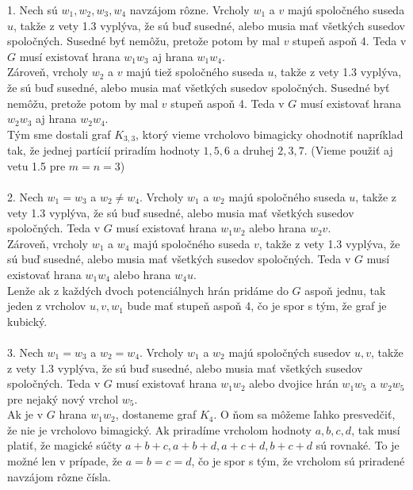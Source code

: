 \documentclass[12pt]{article}
\begin{document}
1. Nech sú $w_1, w_2, w_3, w_4$ navzájom rôzne. Vrcholy $w_1$ a $v$ majú spoločného suseda $u$, takže z vety 1.3 vyplýva, že sú buď susedné, alebo musia mať všetkých susedov spoločných. Susedné byť nemôžu, pretože potom by mal $v$ stupeň aspoň 4. Teda v $G$ musí existovať hrana $w_1 w_3$ aj hrana $w_1 w_4$. \\

Zároveň, vrcholy $w_2$ a $v$ majú tiež spoločného suseda $u$, takže z vety 1.3 vyplýva, že sú buď susedné, alebo musia mať všetkých susedov spoločných. Susedné byť nemôžu, pretože potom by mal $v$ stupeň aspoň 4. Teda v $G$ musí existovať hrana $w_2 w_3$ aj hrana $w_2 w_4$. \\

Tým sme dostali graf $K_{3,3}$, ktorý vieme vrcholovo bimagicky ohodnotiť napríklad tak, že jednej partícií priradím hodnoty $1,5,6$ a druhej $2,3,7$. (Vieme použiť aj vetu 1.5 pre $m = n = 3$) \\\\

2. Nech $w_1 = w_3$ a $w_2 \neq w_4$. Vrcholy $w_1$ a $w_2$ majú spoločného suseda $u$, takže z vety 1.3 vyplýva, že sú buď susedné, alebo musia mať všetkých susedov spoločných. Teda v $G$ musí existovať hrana $w_1 w_2$ alebo hrana $w_2 v$. \\

Zároveň, vrcholy $w_1$ a $w_4$ majú spoločného suseda $v$, takže z vety 1.3 vyplýva, že sú buď susedné, alebo musia mať všetkých susedov spoločných. Teda v $G$ musí existovať hrana $w_1 w_4$ alebo hrana $w_4 u$. \\

Lenže ak z každých dvoch potenciálnych hrán pridáme do $G$ aspoň jednu, tak jeden z vrcholov $u, v, w_1$ bude mať stupeň aspoň 4, čo je spor s tým, že graf je kubický. \\\\

3. Nech $w_1 = w_3$ a $w_2 = w_4$. Vrcholy $w_1$ a $w_2$ majú spoločných susedov $u,v$, takže z vety 1.3 vyplýva, že sú buď susedné, alebo musia mať všetkých susedov spoločných. Teda v $G$ musí existovať hrana $w_1 w_2$ alebo dvojice hrán $w_1 w_5$ a $w_2 w_5$ pre nejaký nový vrchol $w_5$. \\

Ak je v $G$ hrana $w_1 w_2$, dostaneme graf $K_4$. O ňom sa môžeme ľahko presvedčiť, že nie je vrcholovo bimagický. Ak priradíme vrcholom hodnoty $a,b,c,d$, tak musí platiť, že magické súčty $a+b+c, a+b+d, a+c+d, b+c+d$ sú rovnaké. To je možné len v prípade, že $a = b = c = d$, čo je spor s tým, že vrcholom sú priradené navzájom rôzne čísla. \\
\end{document}
